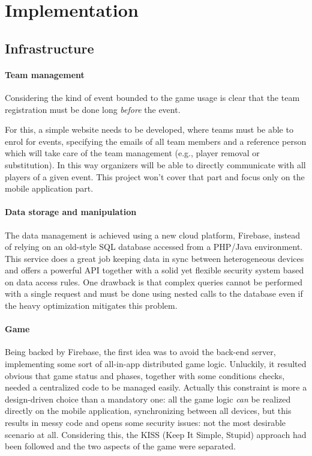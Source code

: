 \chapter{Implementation}

	\section{Infrastructure}
		
		\subsubsection{Team management}
		
			Considering the kind of event bounded to the game usage is clear that the team registration must be done long \emph{before} the event.
			
			For this, a simple website needs to be developed, where teams must be able to enrol for events, specifying the emails of all team members and a reference person which will take care of the team management (e.g., player removal or substitution).
			In this way organizers will be able to directly communicate with all players of a given event.
			This project won't cover that part and focus only on the mobile application part.
		
		\subsubsection{Data storage and manipulation}
			
			The data management is achieved using a new cloud platform, Firebase, instead of relying on an old-style SQL database accessed from a PHP/Java environment.
			This service does a great job keeping data in sync between heterogeneous devices and offers a powerful API together with a solid yet flexible security system based on data access rules.
			One drawback is that complex queries cannot be performed with a single request and must be done using nested calls to the database even if the heavy optimization mitigates this problem.
		
		\subsubsection{Game}
		
			Being backed by Firebase, the first idea was to avoid the back-end server, implementing some sort of all-in-app distributed game logic.
			Unluckily, it resulted obvious that game status and phases, together with some conditions checks, needed a centralized code to be managed easily.
			Actually this constraint is more a design-driven choice than a mandatory one: all the game logic \emph{can} be realized directly on the mobile application, synchronizing between all devices, but this results in messy code and opens some security issues: not the most desirable scenario at all.
			Considering this, the KISS (Keep It Simple, Stupid) approach had been followed and the two aspects of the game were separated.
			
